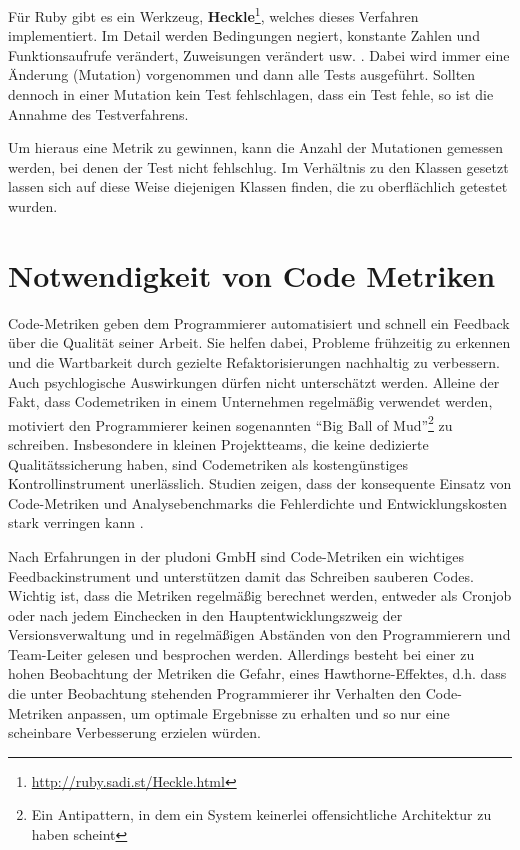  Für Ruby gibt es ein Werkzeug, \textbf{Heckle}\footnote{\url{http://ruby.sadi.st/Heckle.html}}, welches dieses Verfahren implementiert. Im Detail werden Bedingungen negiert, konstante Zahlen und Funktionsaufrufe verändert, Zuweisungen verändert usw. \citep{ruby_sadists_confessions_2010}. Dabei wird immer eine Änderung (Mutation) vorgenommen und dann alle Tests ausgeführt. Sollten dennoch in einer Mutation kein Test fehlschlagen, dass ein Test fehle, so ist die Annahme des Testverfahrens.

 Um hieraus eine Metrik zu gewinnen, kann die Anzahl der Mutationen gemessen werden, bei denen der Test nicht fehlschlug. Im Verhältnis zu den Klassen gesetzt lassen sich auf diese Weise diejenigen Klassen finden, die zu oberflächlich getestet wurden.
 \section{Notwendigkeit von Code Metriken}

 Code-Metriken geben dem Programmierer automatisiert und schnell ein Feedback über die Qualität seiner Arbeit. Sie helfen dabei, Probleme frühzeitig zu erkennen und die Wartbarkeit durch gezielte Refaktorisierungen nachhaltig zu verbessern. Auch psychlogische Auswirkungen dürfen nicht unterschätzt werden. Alleine der Fakt, dass Codemetriken in einem Unternehmen regelmäßig verwendet werden, motiviert den Programmierer keinen sogenannten "`Big Ball of Mud"'\footnote{Ein Antipattern, in dem ein System keinerlei offensichtliche Architektur zu haben scheint} zu schreiben. Insbesondere in kleinen Projektteams, die keine dedizierte Qualitätssicherung haben, sind Codemetriken als kostengünstiges Kontrollinstrument unerlässlich. Studien zeigen, dass der konsequente Einsatz von Code-Metriken und Analysebenchmarks die Fehlerdichte und Entwicklungskosten stark verringen kann \citep[S.10f]{baggen_standardized_2011}.


 Nach Erfahrungen in der pludoni GmbH sind Code-Metriken ein wichtiges Feedbackinstrument und unterstützen damit das Schreiben sauberen Codes. Wichtig ist, dass die Metriken regelmäßig berechnet werden, entweder als Cronjob oder nach jedem Einchecken in den Hauptentwicklungszweig der Versionsverwaltung und in regelmäßigen Abständen von den Programmierern und Team-Leiter gelesen und besprochen werden. Allerdings besteht bei einer zu hohen Beobachtung der Metriken die Gefahr, eines Hawthorne-Effektes, d.h. dass die unter Beobachtung stehenden Programmierer ihr Verhalten den Code-Metriken anpassen, um optimale Ergebnisse zu erhalten \citep[52. Karte]{langr_agile_2011} und so nur eine scheinbare Verbesserung erzielen würden.
